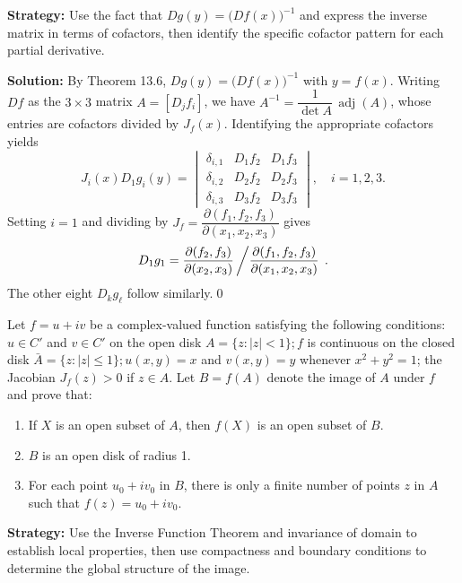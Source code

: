 \noindent\textbf{Strategy:} Use the fact that $Dg(y)=\big(Df(x)\big)^{-1}$ and express the inverse matrix in terms of cofactors, then identify the specific cofactor pattern for each partial derivative.

\bigskip\noindent\textbf{Solution:}
By Theorem 13.6, $Dg(y)=\big(Df(x)\big)^{-1}$ with $y=f(x)$. Writing $Df$ as the $3\times3$ matrix $A=[D_j f_i]$, we have $A^{-1}=\dfrac{1}{\det A}\,\operatorname{adj}(A)$, whose entries are cofactors divided by $J_f(x)$. Identifying the appropriate cofactors yields
\[J_i(x)D_1g_i(y)=\begin{vmatrix}
\delta_{i,1} & D_1f_2 & D_1f_3\\
\delta_{i,2} & D_2f_2 & D_2f_3\\
\delta_{i,3} & D_3f_2 & D_3f_3
\end{vmatrix},\quad i=1,2,3.
\]
Setting $i=1$ and dividing by $J_f=\dfrac{\partial(f_1,f_2,f_3)}{\partial(x_1,x_2,x_3)}$ gives
\[D_1g_1=\frac{\partial(f_2,f_3)}{\partial(x_2,x_3)}\left/\frac{\partial(f_1,f_2,f_3)}{\partial(x_1,x_2,x_3)}\right.\,.
\]
The other eight $D_k g_\ell$ follow similarly.\qed


\begin{problembox}
\begin{problemstatement}
Let \( f = u + iv \) be a complex-valued function satisfying the following conditions: \( u \in C' \) and \( v \in C' \) on the open disk \( A = \{z : |z| < 1\}; f \) is continuous on the closed disk \( \bar{A} = \{z : |z| \leq 1\}; u(x, y) = x \) and \( v(x, y) = y \) whenever \( x^2 + y^2 = 1 \); the Jacobian \( J_f(z) > 0 \) if \( z \in A \). Let \( B = f(A) \) denote the image of \( A \) under \( f \) and prove that:
\begin{enumerate}[label=(\alph*)]
    \item If \( X \) is an open subset of \( A \), then \( f(X) \) is an open subset of \( B \).
    \item \( B \) is an open disk of radius 1.
    \item For each point \( u_0 + iv_0 \) in \( B \), there is only a finite number of points \( z \) in \( A \) such that \( f(z) = u_0 + iv_0 \).
\end{enumerate}
\end{problemstatement}
\end{problembox}

\noindent\textbf{Strategy:} Use the Inverse Function Theorem and invariance of domain to establish local properties, then use compactness and boundary conditions to determine the global structure of the image.

